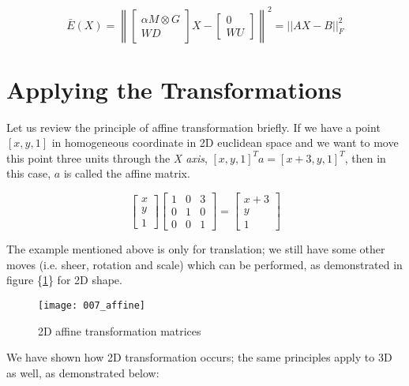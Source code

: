 \documentclass[../structure.tex]{subfiles}
\begin{document}
\begin{equation}
\bar{E}(X) = \left\|
\begin{bmatrix}
\alpha M \otimes G \\ WD
\end{bmatrix}
X -
\begin{bmatrix}
0 \\ WU
\end{bmatrix}
\right\| ^2 = ||AX - B||_{F}^2
\end{equation}

\section{Applying the Transformations}
Let us review the principle of affine transformation briefly. If we have a point $[x,y,1]$ in homogeneous coordinate in 2D euclidean space and we want to move this point three units through the \textit{X axis}, $[x,y,1]^T a = [x+3,y,1]^T$, then in this case, $a$ is called the affine matrix.

\begin{equation*}
\begin{bmatrix}
x \\ y \\ 1
\end{bmatrix}
\begin{bmatrix}
1 & 0 & 3 \\
0 & 1 & 0 \\
0 & 0 & 1
\end{bmatrix}
=
\begin{bmatrix}
x + 3 \\ y \\ 1
\end{bmatrix}
\end{equation*}

The example mentioned above is only for translation; we still have some other moves (i.e. sheer, rotation and scale) which can be performed, as demonstrated in figure \{\ref{fig:affine}\} for 2D shape.

\begin{figure}[h!]
\centering
\texttt{[image: 007\_affine]}
\captionsetup{justification=centering}
\caption{2D affine transformation matrices \cite{Wikipedia2016}}
\label{fig:affine}
\end{figure}

We have shown how 2D transformation occurs; the same principles apply to 3D as well, as demonstrated below:
\end{document}
